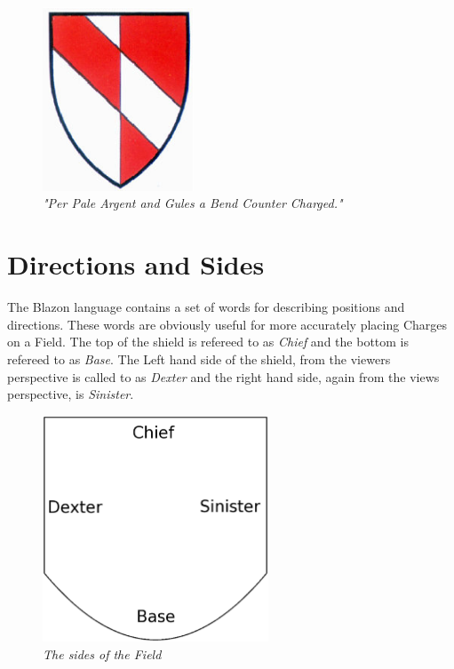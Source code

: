 \begin{figure}[H]
  \centering
    \includegraphics[width=0.4\textwidth]{blazon/images/countercharged.eps}
  \caption{\emph{"Per Pale Argent and Gules a Bend Counter Charged."\cite{countercharge}}}
  
\end{figure}

\section{Directions and Sides}
The Blazon language contains a set of words for describing positions and directions.  These words are obviously useful for more accurately placing Charges on a Field.  The top of the shield is refereed to as \emph{Chief} and the bottom is refereed to as \emph{Base}.  The Left hand side of the shield, from the viewers perspective is called to as \emph{Dexter} and the right hand side, again from the views perspective, is \emph{Sinister}. 

\begin{figure}[H]
  \centering
    \includegraphics[width=0.6\textwidth]{blazon/images/sides.eps}
  \caption{\emph{The sides of the Field}}
  
\end{figure}

